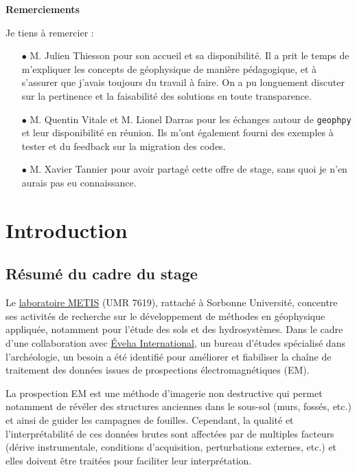 \documentclass[12pt]{article}
\begin{document}
\vskip 30pt
\LARGE \textbf{Remerciements} \normalsize
\vskip 20pt

    Je tiens à remercier :
    \begin{enumerate}
        \item[$\bullet$] M. Julien Thiesson pour son accueil et sa disponibilité. Il a prit le temps de m'expliquer les concepts de géophysique de manière pédagogique, et à s'assurer que j'avais toujours du travail à faire. On a pu longuement discuter sur la pertinence et la faisabilité des solutions en toute transparence.
        \item[$\bullet$] M. Quentin Vitale et M. Lionel Darras pour les échanges autour de \texttt{geophpy} et leur disponibilité en réunion. Ils m'ont également fourni des exemples à tester et du feedback sur la migration des codes.
        \item[$\bullet$] M. Xavier Tannier pour avoir partagé cette offre de stage, sans quoi je n'en aurais pas eu connaissance.
    \end{enumerate}

\vskip 30pt

\tableofcontents

\newpage
{}
\section{Introduction}
\subsection{Résumé du cadre du stage}
    Le \href{https://sciences.sorbonne-universite.fr/structures-de-recherche/metis}{laboratoire METIS} (UMR 7619), rattaché à Sorbonne Université, concentre ses activités de recherche sur le développement de méthodes en géophysique appliquée, notamment pour l'étude des sols et des hydrosystèmes. Dans le cadre d'une collaboration avec \href{https://www.eveha.fr/}{Éveha International}, un bureau d'études spécialisé dans l’archéologie, un besoin a été identifié pour améliorer et fiabiliser la chaîne de traitement des données issues de prospections électromagnétiques (EM).
    
    La prospection EM est une méthode d’imagerie non destructive qui permet notamment de révéler des structures anciennes dans le sous-sol (murs, fossés, etc.) et ainsi de guider les campagnes de fouilles. Cependant, la qualité et l'interprétabilité de ces données brutes sont affectées par de multiples facteurs (dérive instrumentale, conditions d'acquisition, perturbations externes, etc.) et elles doivent être traitées pour faciliter leur interprétation.
    
\end{document}

